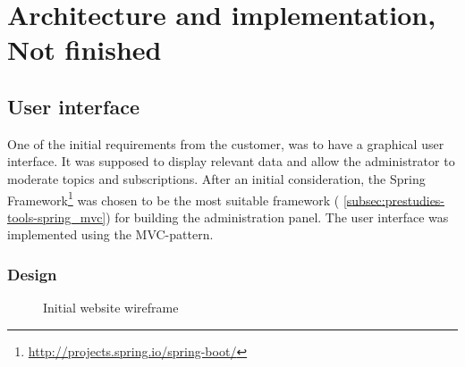
\chapter{Architecture and implementation, Not finished}
\label{ch:architecture_and_implementation}

\section{User interface}
\label{sec:architecture_and_implementation-user_interface}

One of the initial requirements from the customer, was to have a graphical user interface. It was supposed to display relevant data and allow the administrator to moderate topics and subscriptions. After an initial consideration, the Spring Framework\footnote{\url{http://projects.spring.io/spring-boot/}} was chosen to be the most suitable framework ( \ref{subsec:prestudies-tools-spring_mvc}) for building the administration panel. The user interface was implemented using the MVC-pattern. 

\subsection{Design}
\label{subsec:architecture_and_implementation-user_interface-design}

\begin{center}
  \begin{figure}[ht!]
    \caption{Initial website wireframe}
    \label{fig:initial_prototype}
  \end{figure}
\end{center}

